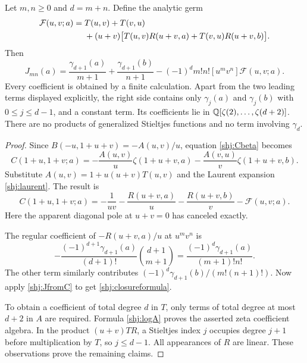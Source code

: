 \begin{theorem}\label{shj:closurethm}
Let $m,n\ge0$ and $d=m+n$. Define the analytic germ
\begin{align}
\mathcal F(u,v;a)={}&T(u,v)+T(v,u)\notag\\
&+(u+v)\big[T(u,v)R(u+v,a)+T(v,u)R(u+v,b)\big].
\label{shj:Fclosure}
\end{align}
Then
\begin{equation}\label{shj:closureformula}
\boxed{\displaystyle
J_{mn}(a)=\frac{\gamma_{d+1}(a)}{m+1}
+\frac{\gamma_{d+1}(b)}{n+1}
-(-1)^d m!n![u^m v^n]\mathcal F(u,v;a).}
\end{equation}
Every coefficient is obtained by a finite calculation. Apart from the two leading terms displayed explicitly, the right side contains only $\gamma_j(a)$ and $\gamma_j(b)$ with $0\le j\le d-1$, and a constant term. Its coefficients lie in
$\mathbb Q[\zeta(2),\ldots,\zeta(d+2)]$.
There are no products of generalized Stieltjes functions and no term involving $\gamma_d$.
\end{theorem}
\begin{proof}
Since $B(-u,1+u+v)=-A(u,v)/u$, equation \eqref{shj:Cbeta} becomes
\begin{equation}\label{shj:Cnear}
C(1+u,1+v;a)=-\frac{A(u,v)}u\zeta(1+u+v,a)
-\frac{A(v,u)}v\zeta(1+u+v,b).
\end{equation}
Substitute $A(u,v)=1+u(u+v)T(u,v)$ and the Laurent expansion \eqref{shj:laurent}. The result is
\begin{equation}\label{shj:Csplit}
C(1+u,1+v;a)=-\frac1{uv}
-\frac{R(u+v,a)}u-\frac{R(u+v,b)}v-\mathcal F(u,v;a).
\end{equation}
Here the apparent diagonal pole at $u+v=0$ has canceled exactly.

The regular coefficient of $-R(u+v,a)/u$ at $u^mv^n$ is
\[
-\frac{(-1)^{d+1}\gamma_{d+1}(a)}{(d+1)!}
\binom{d+1}{m+1}
=\frac{(-1)^d\gamma_{d+1}(a)}{(m+1)!n!}.
\]
The other term similarly contributes
$(-1)^d\gamma_{d+1}(b)/(m!(n+1)!)$.
Now apply \eqref{shj:JfromC} to get \eqref{shj:closureformula}.

To obtain a coefficient of total degree $d$ in $T$, only terms of total degree at most $d+2$ in $A$ are required. Formula \eqref{shj:logA} proves the asserted zeta coefficient algebra. In the product $(u+v)TR$, a Stieltjes index $j$ occupies degree $j+1$ before multiplication by $T$, so $j\le d-1$. All appearances of $R$ are linear. These observations prove the remaining claims.
\end{proof}

